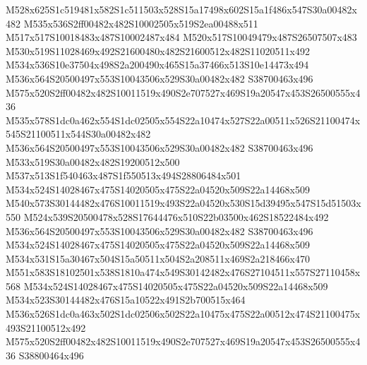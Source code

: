 \documentclass{article}
\begin{document}
\begin{multicols}{2}
M528x625S1c519481x582S1c511503x528S15a17498x602S15a1f486x547S30a00482x482 M535x536S2ff00482x482S10002505x519S2ea00488x511 M517x517S10018483x487S10002487x484 M520x517S10049479x487S26507507x483 M530x519S11028469x492S21600480x482S21600512x482S11020511x492 M534x536S10e37504x498S2a200490x465S15a37466x513S10e14473x494 M536x564S20500497x553S10043506x529S30a00482x482 S38700463x496 M575x520S2ff00482x482S10011519x490S2e707527x469S19a20547x453S26500555x436 M535x578S1dc0a462x554S1dc02505x554S22a10474x527S22a00511x526S21100474x545S21100511x544S30a00482x482 M536x564S20500497x553S10043506x529S30a00482x482 S38700463x496 M533x519S30a00482x482S19200512x500 M537x513S1f540463x487S1f550513x494S28806484x501 M534x524S14028467x475S14020505x475S22a04520x509S22a14468x509 M540x573S30144482x476S10011519x493S22a04520x530S15d39495x547S15d51503x550 M524x539S20500478x528S17644476x510S22b03500x462S18522484x492 M536x564S20500497x553S10043506x529S30a00482x482 S38700463x496 M534x524S14028467x475S14020505x475S22a04520x509S22a14468x509 M534x531S15a30467x504S15a50511x504S2a208511x469S2a218466x470 M551x583S18102501x538S1810a474x549S30142482x476S27104511x557S27110458x568 M534x524S14028467x475S14020505x475S22a04520x509S22a14468x509 M534x523S30144482x476S15a10522x491S2b700515x464 M536x526S1dc0a463x502S1dc02506x502S22a10475x475S22a00512x474S21100475x493S21100512x492 M575x520S2ff00482x482S10011519x490S2e707527x469S19a20547x453S26500555x436 S38800464x496









\end{multicols}
\end{document}
